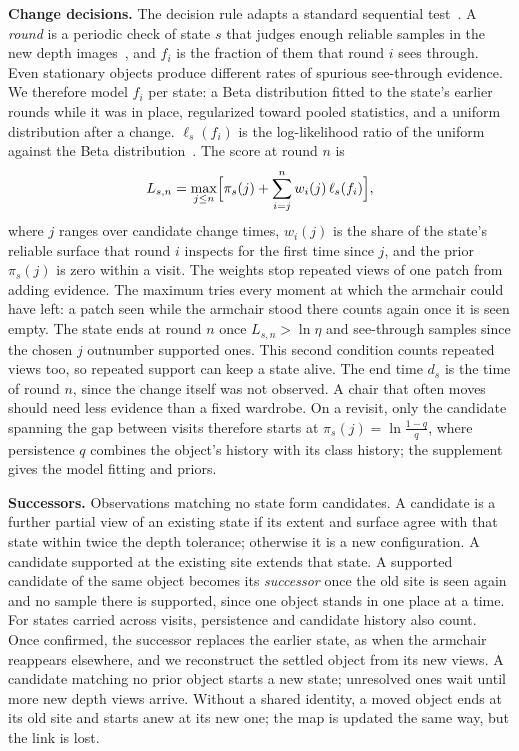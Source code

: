 \documentclass[10pt,twocolumn,letterpaper]{article}
\begin{document}
\vspace{0mm}\noindent\textbf{Change decisions.}
The decision rule adapts a standard sequential test~\cite{Wald1945,Page1954}.
A \emph{round} is a periodic check of state $s$ that judges enough reliable samples in the new depth images~\cite{9811877}, and $f_i$ is the fraction of them that round $i$ sees through. Even stationary objects produce different rates of spurious see-through evidence. We therefore model $f_i$ per state: a Beta distribution fitted to the state's earlier rounds while it was in place, regularized toward pooled statistics, and a uniform distribution after a change. $\ell_s(f_i)$ is the log-likelihood ratio of the uniform against the Beta distribution~\cite{smithson2006lemon}. The score at round $n$ is
\begin{equation}
  L_{s,n}=\max_{j\le n}\Bigl[\pi_s(j)+\sum_{i=j}^{n} w_i(j)\,\ell_s(f_i)\Bigr],
  \label{eq:score}
\end{equation}
where $j$ ranges over candidate change times, $w_i(j)$ is the share of the state's reliable surface that round $i$ inspects for the first time since $j$, and the prior $\pi_s(j)$ is zero within a visit. The weights stop repeated views of one patch from adding evidence. The maximum tries every moment at which the armchair could have left: a patch seen while the armchair stood there counts again once it is seen empty.
The state ends at round $n$ once $L_{s,n}>\ln\eta$ and see-through
samples since the chosen $j$ outnumber supported ones. This second condition counts repeated views too, so repeated support can keep a state alive. The end time $d_s$ is the time of round $n$, since the change itself was not observed. A chair that often moves should need less evidence than a fixed wardrobe. On a revisit, only the candidate spanning the gap between visits therefore
starts at $\pi_s(j)=\ln\frac{1-q}{q}$, where persistence $q$ combines the object's history with its class history; the supplement gives the model fitting and priors.

\vspace{0mm}\noindent\textbf{Successors.}
Observations matching no state form candidates. A candidate is a further partial view of an existing state if its extent and surface agree with that state within twice the depth tolerance; otherwise it is a new configuration. A candidate supported at the existing site extends that state. A supported candidate of the same object becomes its
\emph{successor} once the old site is seen again and no sample there is supported, since one object stands in one place at a time. For states carried across visits, persistence and candidate
history also count. Once confirmed, the successor replaces the earlier state, as when the armchair reappears
elsewhere, and we reconstruct the settled object from its new views. A candidate matching no prior object starts a new
state; unresolved ones wait until more new depth views arrive. Without a shared identity, a moved object ends at its old site and starts anew at its new one; the map is updated the same way, but the link is lost.
\end{document}
